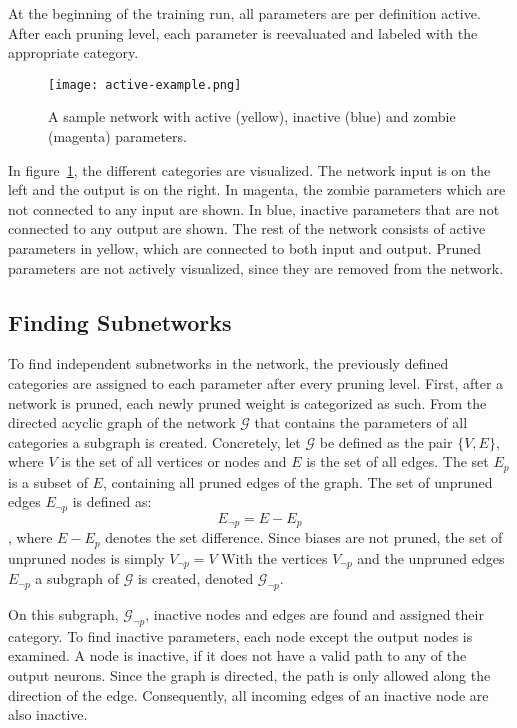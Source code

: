 At the beginning of the training run, all parameters are per definition active.
After each pruning level, each parameter is reevaluated and labeled with the appropriate category.

\begin{figure}[ht] %
    \centering
    \texttt{[image: active-example.png]}
    \caption[Active, inactive and zombies example]{
    A sample network with active (yellow), inactive (blue) and zombie (magenta) parameters.
    }\label{fig:parameter_categories}
\end{figure}

In figure~\ref{fig:parameter_categories}, the different categories are visualized.
The network input is on the left and the output is on the right.
In magenta, the zombie parameters which are not connected to any input are shown.
In blue, inactive parameters that are not connected to any output are shown.
The rest of the network consists of active parameters in yellow, which are connected to both input and output.
Pruned parameters are not actively visualized, since they are removed from the network.

\subsection{Finding Subnetworks}\label{sec:FindSubnet}
To find independent subnetworks in the network, the previously defined categories are assigned to each parameter after every pruning level.
First, after a network is pruned, each newly pruned weight is categorized as such.
From the directed acyclic graph of the network $\mathcal{G}$ that contains the parameters of all categories a subgraph is created.
Concretely, let $\mathcal{G}$ be defined as the pair $\{V, E\}$, where $V$ is the set of all vertices or nodes and $E$ is the set of all edges.
The set $E_p$ is a subset of $E$, containing all pruned edges of the graph.
The set of unpruned edges $E_{\neg p}$ is defined as:
\[ E_{\neg p} = E - E_p \]
, where $E-E_p$ denotes the set difference.
Since biases are not pruned, the set of unpruned nodes is simply $V_{\neg p} = V$
With the vertices $V_{\neg p}$ and the unpruned edges $E_{\neg p}$ a subgraph of $\mathcal{G}$ is created, denoted $\mathcal{G}_{\neg p}$.

On this subgraph, $\mathcal{G}_{\neg p}$, inactive nodes and edges are found and assigned their category.
To find inactive parameters, each node except the output nodes is examined.
A node is inactive, if it does not have a valid path to any of the output neurons.
Since the graph is directed, the path is only allowed along the direction of the edge.
Consequently, all incoming edges of an inactive node are also inactive.

